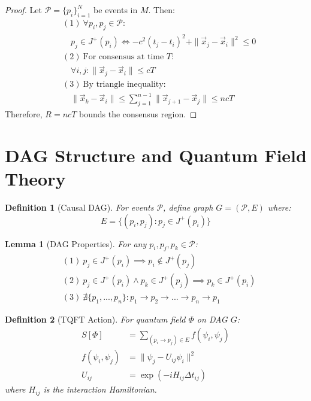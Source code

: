 \documentclass{article}
\newtheorem{definition}{Definition}
\newtheorem{lemma}{Lemma}
\begin{document}
\begin{proof}
Let $\mathcal{P} = \{p_i\}_{i=1}^N$ be events in $M$. Then:
\begin{align*}
    &(1)\ \forall p_i, p_j \in \mathcal{P}: \\
    &\quad p_j \in J^+(p_i) \iff -c^2(t_j-t_i)^2 + \|\vec{x}_j-\vec{x}_i\|^2 \leq 0 \\
    &(2)\ \text{For consensus at time } T: \\
    &\quad \forall i,j: \|\vec{x}_j-\vec{x}_i\| \leq cT \\
    &(3)\ \text{By triangle inequality}: \\
    &\quad \|\vec{x}_k-\vec{x}_i\| \leq \sum_{j=1}^{n-1} \|\vec{x}_{j+1}-\vec{x}_j\| \leq ncT
\end{align*}
Therefore, $R = ncT$ bounds the consensus region.
\end{proof}

\section{DAG Structure and Quantum Field Theory}

\begin{definition}[Causal DAG]
For events $\mathcal{P}$, define graph $G = (\mathcal{P}, E)$ where:
\[ E = \{(p_i, p_j) : p_j \in J^+(p_i)\} \]
\end{definition}

\begin{lemma}[DAG Properties]
For any $p_i, p_j, p_k \in \mathcal{P}$:
\begin{align*}
    &(1)\ p_j \in J^+(p_i) \implies p_i \notin J^+(p_j) \\
    &(2)\ p_j \in J^+(p_i) \land p_k \in J^+(p_j) \implies p_k \in J^+(p_i) \\
    &(3)\ \nexists \{p_1,...,p_n\} : p_1 \to p_2 \to ... \to p_n \to p_1
\end{align*}
\end{lemma}

\begin{definition}[TQFT Action]
For quantum field $\Phi$ on DAG $G$:
\begin{align*}
    S[\Phi] &= \sum_{(p_i \to p_j) \in E} f(\psi_i, \psi_j) \\
    f(\psi_i, \psi_j) &= \|\psi_j - U_{ij}\psi_i\|^2 \\
    U_{ij} &= \exp(-iH_{ij}\Delta t_{ij})
\end{align*}
where $H_{ij}$ is the interaction Hamiltonian.
\end{definition}
\end{document}
